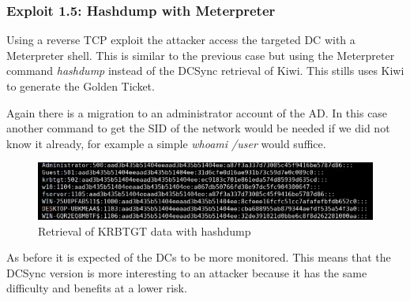 \subsubsection{Exploit 1.5: Hashdump with Meterpreter}
Using a reverse TCP exploit the attacker access the targeted DC with a Meterpreter shell. This is similar to the previous case but using the Meterpreter command \textit{hashdump} instead of the DCSync retrieval of Kiwi\cite{pentestlab}. This stills uses Kiwi to generate the Golden Ticket.
\linej

\linej
Again there is a migration to an administrator account of the AD. In this case another command to get the SID of the network would be needed if we did not know it already, for example a simple \textit{whoami /user} would suffice.
\linej

\begin{figure}[H]
	\centering
	\includegraphics[width=\textwidth]{figuras/hashdump.png}
	\caption{Retrieval of KRBTGT data with hashdump}
\end{figure}
\linej
As before it is expected of the DCs to be more monitored. This means that the DCSync version is more interesting to an attacker because it has the same difficulty and benefits at a lower risk.

